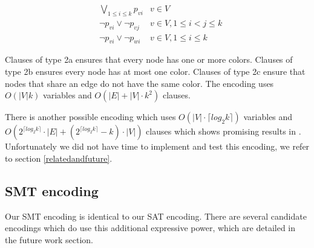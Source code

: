 \documentclass{sig-alternate}
\begin{document}
\setcounter{equation}{1}
\begin{subequations}
\begin{align}
        & \bigvee_{1 \leq i \leq k} p_{vi}& v \in V\\
        & \neg p_{vi} \lor \neg p_{vj} & v \in V, 1 \leq i < j \leq k \\
        & \neg p_{vi} \lor \neg p_{wi} & v \in V, 1 \leq i \leq k
\end{align}
\end{subequations}

Clauses of type 2a ensures that every node has one or more colors. Clauses of type 2b ensures every node has at most one color. Clauses of type 2c ensure that nodes that share an edge do not have the same color.
The encoding uses $O(|V| k)$ variables and $O(|E|+|V| \cdot k^2)$ clauses.

There is another possible encoding which uses $O(|V| \cdot \lceil{log_2{k}\rceil})$ variables and $O(2^{\lceil{log_2k}\rceil} \cdot |E|+(2^{\lceil{log_2k\rceil}}-k) \cdot |V|)$ clauses which shows promising results in \cite{wille2008using}.
Unfortunately we did not have time to implement and test this encoding, we refer to section \ref{relatedandfuture}.

\subsection{SMT encoding}
Our SMT encoding is identical to our SAT encoding.
There are several candidate encodings which do use this additional expressive power, which are detailed in the future work section.
\end{document}
